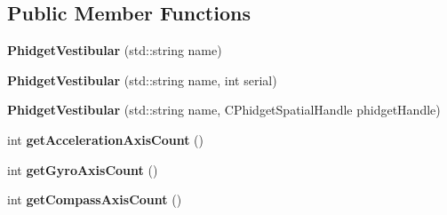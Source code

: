 \subsection*{Public Member Functions}
\begin{DoxyCompactItemize}
\item 
\hypertarget{classdrobot_1_1device_1_1vestibular_1_1PhidgetVestibular_ab55a9ea87ecb65d414d09841d2113acf}{{\bfseries Phidget\-Vestibular} (std\-::string name)}\label{classdrobot_1_1device_1_1vestibular_1_1PhidgetVestibular_ab55a9ea87ecb65d414d09841d2113acf}

\item 
\hypertarget{classdrobot_1_1device_1_1vestibular_1_1PhidgetVestibular_a2736f1b981aac44e03e97f06351efd24}{{\bfseries Phidget\-Vestibular} (std\-::string name, int serial)}\label{classdrobot_1_1device_1_1vestibular_1_1PhidgetVestibular_a2736f1b981aac44e03e97f06351efd24}

\item 
\hypertarget{classdrobot_1_1device_1_1vestibular_1_1PhidgetVestibular_abe2423ad121ae794fb7c0301f1baa185}{{\bfseries Phidget\-Vestibular} (std\-::string name, C\-Phidget\-Spatial\-Handle phidget\-Handle)}\label{classdrobot_1_1device_1_1vestibular_1_1PhidgetVestibular_abe2423ad121ae794fb7c0301f1baa185}

\item 
\hypertarget{classdrobot_1_1device_1_1vestibular_1_1PhidgetVestibular_a50525a601dd2fda430ed3c4dd1f9806b}{int {\bfseries get\-Acceleration\-Axis\-Count} ()}\label{classdrobot_1_1device_1_1vestibular_1_1PhidgetVestibular_a50525a601dd2fda430ed3c4dd1f9806b}

\item 
\hypertarget{classdrobot_1_1device_1_1vestibular_1_1PhidgetVestibular_a26b31bd12161bbf3cce93947cf91e948}{int {\bfseries get\-Gyro\-Axis\-Count} ()}\label{classdrobot_1_1device_1_1vestibular_1_1PhidgetVestibular_a26b31bd12161bbf3cce93947cf91e948}

\item 
\hypertarget{classdrobot_1_1device_1_1vestibular_1_1PhidgetVestibular_ae3ac5b15d461db8e8f3cd499c66c7593}{int {\bfseries get\-Compass\-Axis\-Count} ()}\label{classdrobot_1_1device_1_1vestibular_1_1PhidgetVestibular_ae3ac5b15d461db8e8f3cd499c66c7593}


\end{DoxyCompactItemize}
